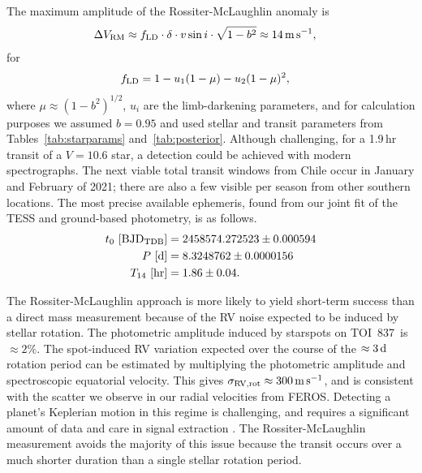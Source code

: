 \documentclass[12pt,twocolumn,tighten]{aastex63}
\newcommand{\tn}{TOI~837} %
\begin{document}
The maximum amplitude of the Rossiter-McLaughlin anomaly is
\citep{gaudi_prospects_2007}
\begin{align}
  \Delta V_{\rm RM} &\approx f_{\rm LD} \cdot \delta \cdot v\sin i \cdot \sqrt{1-b^2}
  \approx 14\,{\rm m\,s}^{-1},
\end{align}
for
\begin{align}
  f_{\rm LD} &= 1 - u_1 ( 1 - \mu ) - u_2 (1 - \mu )^2,
\end{align}
where $\mu \approx (1 - b^2)^{1/2}$, $u_i$ are the limb-darkening
parameters, and for calculation purposes we
assumed $b=0.95$ and used stellar and transit parameters from
Tables~\ref{tab:starparams} and~\ref{tab:posterior}.  Although
challenging, for a 1.9$\,$hr transit of a $V=10.6$ star, a detection
could be achieved with modern spectrographs.  The next viable total
transit windows from Chile occur in January and February of 2021;
there are also a few visible per season from other southern locations.
The most precise available ephemeris, found from our joint fit of the
TESS and ground-based photometry, is as follows.
\begin{align}
  t_0\ [{\rm BJD_{TDB}}] &= 2458574.272523 \pm 0.000594 \nonumber \\
  P\ [{\rm d}] &= 8.3248762 \pm 0.0000156 \nonumber \\
  T_{14}\ [{\rm hr}] &= 1.86 \pm 0.04.
  \label{eq:ephem}
\end{align}

The Rossiter-McLaughlin approach is more likely to yield short-term
success than a direct mass measurement because of the RV noise
expected to be induced by stellar rotation.  The photometric amplitude
induced by starspots on \tn\ is $\approx 2\%$.  The spot-induced RV
variation expected over the course of the $\approx 3\,{\rm d}$
rotation period can be estimated by multiplying the photometric
amplitude and spectroscopic equatorial velocity.  This gives
$\sigma_{\rm RV,rot} \approx 300\,{\rm m\,s}^{-1}$, and is consistent
with the scatter we observe in our radial velocities from FEROS.
Detecting a planet's Keplerian motion in this regime is challenging,
and requires a significant amount of data and care in signal
extraction \citep{barragan_radial_2019}.  The Rossiter-McLaughlin
measurement avoids the majority of this issue because the transit
occurs over a much shorter duration than a single stellar rotation
period.  
\end{document}
